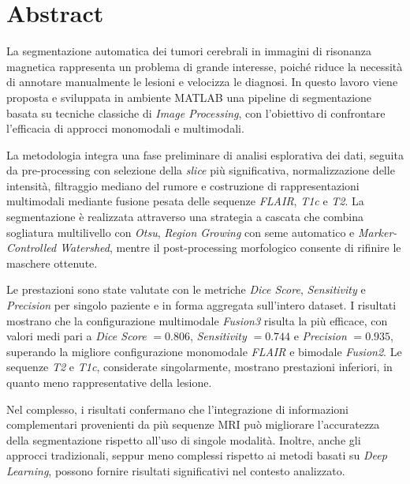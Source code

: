 \chapter*{Abstract}
La segmentazione automatica dei tumori cerebrali in immagini di risonanza magnetica rappresenta un problema di grande interesse, poiché riduce la necessità di annotare manualmente le lesioni e velocizza le diagnosi. In questo lavoro viene proposta e sviluppata in ambiente MATLAB una pipeline di segmentazione basata su tecniche classiche di \textit{Image Processing}, con l’obiettivo di confrontare l’efficacia di approcci monomodali e multimodali.

La metodologia integra una fase preliminare di analisi esplorativa dei dati, seguita da pre-processing con selezione della \textit{slice} più significativa, normalizzazione delle intensità, filtraggio mediano del rumore e costruzione di rappresentazioni multimodali mediante fusione pesata delle sequenze \textit{FLAIR}, \textit{T1c} e \textit{T2}. La segmentazione è realizzata attraverso una strategia a cascata che combina sogliatura multilivello con \textit{Otsu}, \textit{Region Growing} con seme automatico e \textit{Marker-Controlled Watershed}, mentre il post-processing morfologico consente di rifinire le maschere ottenute.

Le prestazioni sono state valutate con le metriche \textit{Dice Score}, \textit{Sensitivity} e \textit{Precision} per singolo paziente e in forma aggregata sull’intero dataset. I risultati mostrano che la configurazione multimodale \textit{Fusion3} risulta la più efficace, con valori medi pari a \textit{Dice Score} \(= 0.806\), \textit{Sensitivity} \(= 0.744\) e \textit{Precision} \(= 0.935\), superando la migliore configurazione monomodale \textit{FLAIR} e bimodale \textit{Fusion2}. Le sequenze \textit{T2} e \textit{T1c}, considerate singolarmente, mostrano prestazioni inferiori, in quanto meno rappresentative della lesione.

Nel complesso, i risultati confermano che l’integrazione di informazioni complementari provenienti da più sequenze MRI può migliorare l’accuratezza della segmentazione rispetto all’uso di singole modalità. Inoltre, anche gli approcci tradizionali, seppur meno complessi rispetto ai metodi basati su \textit{Deep Learning}, possono fornire risultati significativi nel contesto analizzato.